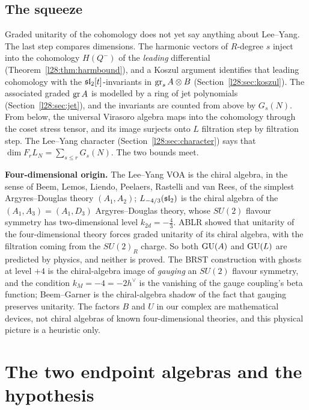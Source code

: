 \subsection{The squeeze}

Graded unitarity of the cohomology does not yet say anything about Lee--Yang. The last step compares dimensions. The
harmonic vectors of $R$-degree $s$ inject into the cohomology $H(Q^-)$ of the \emph{leading} differential
(Theorem~\ref{l28:thm:harmbound}), and a Koszul argument identifies that leading cohomology with the
$\mathfrak{sl}_2[t]$-invariants in $\operatorname{gr}_sA\otimes B$ (Section~\ref{l28:sec:koszul}). The associated graded
$\operatorname{gr} A$ is modelled by a ring of jet polynomials (Section~\ref{l28:sec:jet}), and the invariants are
counted from above by $G_s(N)$. From below, the universal Virasoro algebra maps into the cohomology through the coset
stress tensor, and its image surjects onto $L$ filtration step by filtration step. The Lee--Yang character
(Section~\ref{l28:sec:character}) says that $\dim F_rL_N=\sum_{s\le r}G_s(N)$. The two bounds meet.

\begin{physics}
\textbf{Four-dimensional origin.} The Lee--Yang VOA is the chiral algebra, in the sense of Beem, Lemos, Liendo, Peelaers,
Rastelli and van Rees, of the simplest Argyres--Douglas theory $(A_1,A_2)$; $L_{-4/3}(\mathfrak{sl}_2)$ is the chiral algebra
of the $(A_1,A_3)=(A_1,D_3)$ Argyres--Douglas theory, whose $SU(2)$ flavour symmetry has two-dimensional level
$k_{2d}=-\tfrac43$. ABLR showed that unitarity of the four-dimensional theory forces graded unitarity of its chiral algebra,
with the filtration coming from the $SU(2)_R$ charge. So both $\mathrm{GU}(A)$ and $\mathrm{GU}(L)$ are predicted by
physics, and neither is proved. The BRST construction with ghosts at level $+4$ is the chiral-algebra image of
\emph{gauging} an $SU(2)$ flavour symmetry, and the condition $k_M=-4=-2h^\vee$ is the vanishing of the gauge coupling's beta
function; Beem--Garner is the chiral-algebra shadow of the fact that gauging preserves unitarity. The factors $B$ and $U$
in our complex are mathematical devices, not chiral algebras of known four-dimensional theories, and this physical
picture is a heuristic only.
\end{physics}

\section{The two endpoint algebras and the hypothesis}\label{l28:sec:endpoints}

